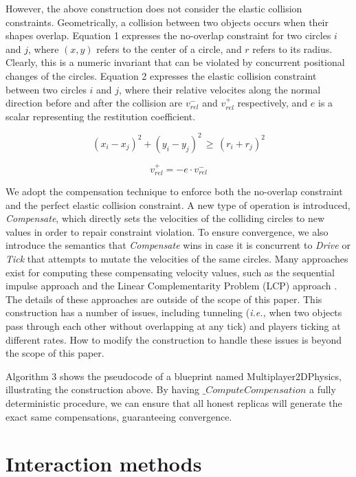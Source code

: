 \documentclass{article}
\begin{document}
However, the above construction does not consider the elastic collision constraints. Geometrically, a collision between two objects occurs when their shapes overlap. Equation 1 expresses the no-overlap constraint for two circles $i$ and $j$, where $(x,y)$ refers to the center of a circle, and $r$ refers to its radius. Clearly, this is a numeric invariant that can be violated by concurrent positional changes of the circles. Equation 2 expresses the elastic collision constraint between two circles $i$ and $j$, where their relative velocites along the normal direction before and after the collision are $v^-_{rel}$ and $v^+_{rel}$ respectively, and $e$ is a scalar representing the restitution coefficient.

\begin{equation}
(x_i-x_j)^2 + (y_i-y_j)^2 \,\geq\, (r_i + r_j)^2
\end{equation}

\begin{equation}
v^+_{rel} = -e \cdot v^-_{rel}
\end{equation}

We adopt the compensation technique to enforce both the no-overlap constraint and the perfect elastic collision constraint. A new type of operation is introduced, \textit{Compensate}, which directly sets the velocities of the colliding circles to new values in order to repair constraint violation. To ensure convergence, we also introduce the semantics that \textit{Compensate} wins in case it is concurrent to \textit{Drive} or \textit{Tick} that attempts to mutate the velocities of the same circles.  Many approaches exist for computing these compensating velocity values, such as the sequential impulse approach \cite{Jakobsen, Guendelman} and the Linear Complementarity Problem (LCP) approach \cite{LCP, Box2D}. The details of these approaches are outside of the scope of this paper. This construction has a number of issues, including tunneling (\textit{i.e., } when two objects pass through each other without overlapping at any tick) and players ticking at different rates. How to modify the construction to handle these issues is beyond the scope of this paper.

Algorithm 3 shows the pseudocode of a blueprint named Multiplayer2DPhysics, illustrating the construction above. By having $\_ComputeCompensation$ a fully deterministic procedure, we can ensure that all honest replicas will generate the exact same compensations, guaranteeing convergence.

\section{Interaction methods}
\label{sec:headings}
\end{document}
